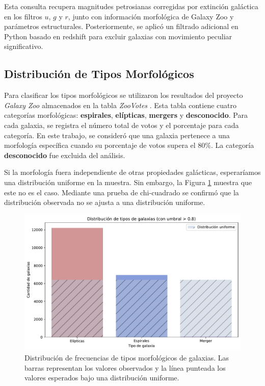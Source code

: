 \documentclass[twocolumn]{article}
\begin{document}
Esta consulta recupera magnitudes petrosianas corregidas por extinción galáctica en los filtros $u$, $g$ y $r$, junto con información morfológica de Galaxy Zoo y parámetros estructurales. Posteriormente, se aplicó un filtrado adicional en Python basado en redshift para excluir galaxias con movimiento peculiar significativo.

\subsection{Distribución de Tipos Morfológicos}

Para clasificar los tipos morfológicos se utilizaron los resultados del proyecto \textit{Galaxy Zoo} almacenados en la tabla \textit{ZooVotes} \citep{zoovotes}. Esta tabla contiene cuatro categorías morfológicas: \textbf{espirales}, \textbf{elípticas}, \textbf{mergers} y \textbf{desconocido}. Para cada galaxia, se registra el número total de votos y el porcentaje para cada categoría. En este trabajo, se consideró que una galaxia pertenece a una morfología específica cuando su porcentaje de votos supera el $80\%$. La categoría \textbf{desconocido} fue excluida del análisis.

Si la morfología fuera independiente de otras propiedades galácticas, esperaríamos una distribución uniforme en la muestra. Sin embargo, la Figura \ref{fig:morf} muestra que este no es el caso. Mediante una prueba de chi-cuadrado se confirmó que la distribución observada no se ajusta a una distribución uniforme.

\begin{figure}[ht]
\includegraphics[width=\linewidth]{morfologia.pdf}
\caption{Distribución de frecuencias de tipos morfológicos de galaxias. Las barras representan los valores observados y la línea punteada los valores esperados bajo una distribución uniforme.}
\label{fig:morf}
\end{figure}
\end{document}
